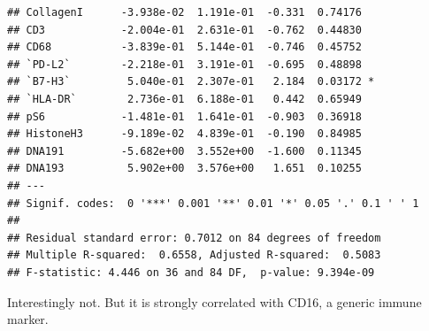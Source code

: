 \documentclass[a4paper]{article}\usepackage[]{graphicx}\usepackage[]{color}
\makeatletter
\newenvironment{kframe}{%
 \def\at@end@of@kframe{}%
 \ifinner\ifhmode%
  \def\at@end@of@kframe{\end{minipage}}%
  \begin{minipage}{\columnwidth}%
 \fi\fi%
 \def\FrameCommand##1{\hskip\@totalleftmargin \hskip-\fboxsep
 \colorbox{shadecolor}{##1}\hskip-\fboxsep
     \hskip-\linewidth \hskip-\@totalleftmargin \hskip\columnwidth}%
 \MakeFramed {\advance\hsize-\width
   \@totalleftmargin\z@ \linewidth\hsize
   \@setminipage}}%
 {\par\unskip\endMakeFramed%
 \at@end@of@kframe}
\newenvironment{knitrout}{}{} %
\makeatother
\begin{document}
\begin{knitrout}
\begin{kframe}
\begin{verbatim}
## CollagenI      -3.938e-02  1.191e-01  -0.331  0.74176    
## CD3            -2.004e-01  2.631e-01  -0.762  0.44830    
## CD68           -3.839e-01  5.144e-01  -0.746  0.45752    
## `PD-L2`        -2.218e-01  3.191e-01  -0.695  0.48898    
## `B7-H3`         5.040e-01  2.307e-01   2.184  0.03172 *  
## `HLA-DR`        2.736e-01  6.188e-01   0.442  0.65949    
## pS6            -1.481e-01  1.641e-01  -0.903  0.36918    
## HistoneH3      -9.189e-02  4.839e-01  -0.190  0.84985    
## DNA191         -5.682e+00  3.552e+00  -1.600  0.11345    
## DNA193          5.902e+00  3.576e+00   1.651  0.10255    
## ---
## Signif. codes:  0 '***' 0.001 '**' 0.01 '*' 0.05 '.' 0.1 ' ' 1
## 
## Residual standard error: 0.7012 on 84 degrees of freedom
## Multiple R-squared:  0.6558,	Adjusted R-squared:  0.5083 
## F-statistic: 4.446 on 36 and 84 DF,  p-value: 9.394e-09
\end{verbatim}
\end{kframe}
\end{knitrout}
Interestingly not. But it is strongly correlated with CD16, a generic immune marker.
\end{document}
